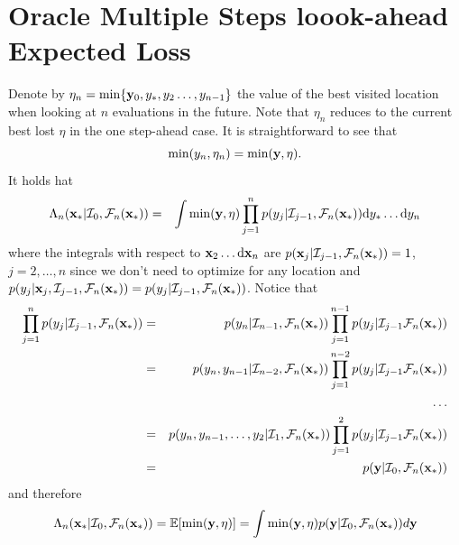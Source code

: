 \documentclass[twoside]{article}
\newcommand{\I}{\mathcal{I}}
\newcommand{\ud}{\mathrm{d}}
\newcommand{\E}{\mathbb{E}}
\newcommand{\future}{\mathcal{F}}
\begin{document}
\vspace{1cm}
\section{Oracle Multiple Steps loook-ahead Expected Loss }
Denote by $\eta_n = \min \{\mathbf{y}_0, y_*, y_2\dots,y_{n-1}\}$ the value of the best visited location when looking at $n$ evaluations in the future. Note that $\eta_n$ reduces to the current best lost $\eta$ in the one step-ahead case. It is straightforward to see that 
$$ \min (y_n,\eta_n) = \min (\mathbf{y},\eta ).$$
It holds hat
\begin{eqnarray}\nonumber
\Lambda_n(\latentVector_*|\I_0, \future_{n}(\latentVector_*)) & = & \int \min (\dataVector,\eta) \prod_{j=1}^{n}p(y_{j}|\I_{j-1}, \future_{n}(\latentVector_*)) \ud y_*\dots \ud y_n
\end{eqnarray}
where the integrals with respect to $\latentVector_2\dots \ud\latentVector_n$ are  $p(\latentVector_{j}|\I_{j-1}, \future_{n}(\latentVector_*))=1$, $j=2,\dots,n$ since we don't need to optimize for any location and $p(y_{j}|\latentVector_{j},\I_{j-1}, \future_{n}(\latentVector_*))=p(y_{j}|\I_{j-1}, \future_{n}(\latentVector_*))$. Notice that
\begin{eqnarray}\nonumber
\prod_{j=1}^{n}p(y_{j}|\I_{j-1}, \future_{n}(\latentVector_*))& =& p(y_n|\I_{n-1}, \future_{n}(\latentVector_*)) \prod_{j=1}^{n-1}p(y_{j}|\I_{j-1} \future_{n}(\latentVector_*))\\\nonumber
& = & p(y_n,y_{n-1}|\I_{n-2}, \future_{n}(\latentVector_*))  \prod_{j=1}^{n-2}p(y_{j}|\I_{j-1} \future_{n}(\latentVector_*))\\\nonumber
& & \dots \\\nonumber
& = & p(y_n,y_{n-1},\dots,y_2|\I_{1}, \future_{n}(\latentVector_*))\prod_{j=1}^{2}p(y_{j}|\I_{j-1} \future_{n}(\latentVector_*))\\\nonumber
& = & p(\dataVector|\I_{0}, \future_{n}(\latentVector_*)) \nonumber
\end{eqnarray}
and therefore 
$$ \Lambda_n(\latentVector_*|\I_0, \future_{n}(\latentVector_*)) =\E [\min (\dataVector,\eta)] =\int \min (\dataVector,\eta)p(\dataVector|\I_{0}, \future_{n}(\latentVector_*))d\dataVector  $$

\vspace{1cm}
\end{document}
